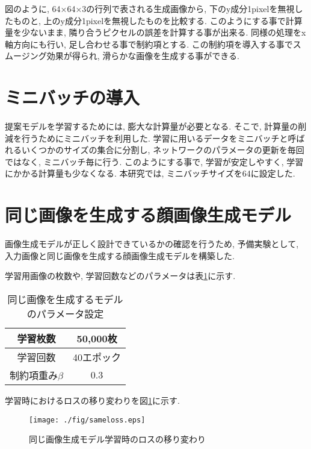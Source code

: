 図のように, 64×64×3の行列で表される生成画像から, 下のy成分1pixelを無視したものと, 上のy成分1pixelを無視したものを比較する. このようにする事で計算量を少ないまま, 隣り合うピクセルの誤差を計算する事が出来る. 同様の処理をx軸方向にも行い, 足し合わせる事で制約項とする. この制約項を導入する事でスムージング効果が得られ, 滑らかな画像を生成する事ができる. 

\section{ミニバッチの導入}
提案モデルを学習するためには, 膨大な計算量が必要となる. そこで, 計算量の削減を行うためにミニバッチを利用した. 学習に用いるデータをミニバッチと呼ばれるいくつかのサイズの集合に分割し, ネットワークのパラメータの更新を毎回ではなく, ミニバッチ毎に行う. このようにする事で, 学習が安定しやすく, 学習にかかる計算量も少なくなる. 
本研究では, ミニバッチサイズを64に設定した. 

\section{同じ画像を生成する顔画像生成モデル}
画像生成モデルが正しく設計できているかの確認を行うため, 予備実験として, 入力画像と同じ画像を生成する顔画像生成モデルを構築した. 

学習用画像の枚数や, 学習回数などのパラメータは表\ref{tab:sameparam}に示す. 
\begin{table}[H]
  \begin{center}
    \caption{同じ画像を生成するモデルのパラメータ設定}
    \begin{tabular}{|c|c|} \hline
      学習枚数 & 50,000枚  \\ \hline
      学習回数 & 40エポック  \\ \hline
      制約項重み$\beta$ & 0.3  \\ \hline
    \end{tabular}
    \label{tab:sameparam}
  \end{center}
\end{table}

学習時におけるロスの移り変わりを図\ref{fig:sameloss}に示す. 
\begin{figure}[H]
 	\begin{center}
 		\texttt{[image: ./fig/sameloss.eps]}
 		\caption{同じ画像生成モデル学習時のロスの移り変わり}
 		\label{fig:sameloss}
 	\end{center}
 \end{figure}

